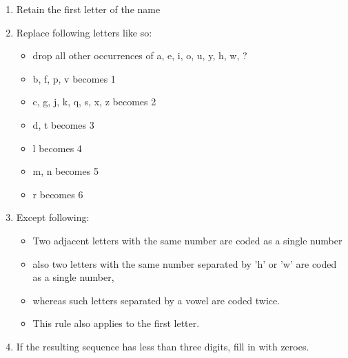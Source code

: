\documentclass[a4paper,12pt]{article}
\begin{document}
\begin{enumerate}
    \item Retain the first letter of the name 
    \item Replace following letters like so:\begin{itemize}
            \item drop all other occurrences of a, e, i, o, u, y, h, w, ?
            \item b, f, p, v becomes 1
            \item c, g, j, k, q, s, x, z becomes 2
            \item d, t becomes 3
            \item l becomes 4
            \item m, n becomes 5
            \item r becomes 6
        \end{itemize}
    \item Except following:\begin{itemize}
            \item Two adjacent letters with the same number are coded as a
                single number
            \item also two letters with the same number separated by 'h' or 'w'
                are coded as a single number,
            \item whereas such letters separated by a vowel are coded twice.
            \item This rule also applies to the first letter.
        \end{itemize}
    \item If the resulting sequence has less than three digits, fill in with
        zeroes.
\end{enumerate}
\end{document}
